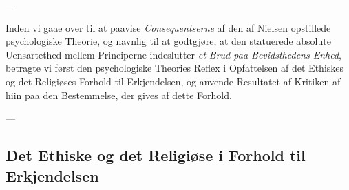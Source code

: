 \documentclass[12pt,a4paper]{book}
\newcommand{\opage}[1]{\marginnote{\footnotesize\textit{[#1]}}}
\begin{document}
\begin{center}---\end{center}

Inden vi gaae over til at paavise \emph{Consequentserne} af den af Nielsen opstillede
psychologiske Theorie, og navnlig til at godtgjøre, at den statuerede absolute Uensartethed
mellem Principerne indeslutter \emph{et Brud paa Bevidsthedens Enhed}, betragte vi først
den psychologiske Theories Reflex i Opfattelsen af det Ethiskes og det Religiøses Forhold
til Erkjendelsen, og anvende Resultatet af Kritiken af hiin paa den Bestemmelse, der gives
af dette Forhold.

\begin{center}---\end{center}

\subsection{Det Ethiske og det Religiøse i Forhold til Erkjendelsen} \opage{161} 
\label{ssec:ethisk-religioes}
\end{document}
